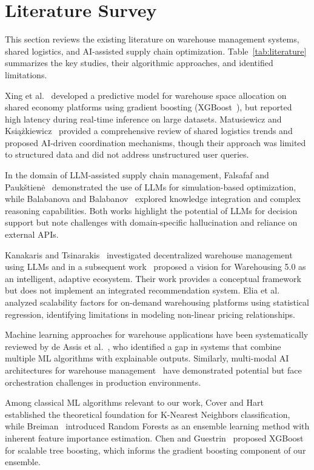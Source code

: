 \documentclass[pdflatex,sn-mathphys-num]{sn-jnl}
\theoremstyle{thmstyleone}
\theoremstyle{thmstyletwo}
\theoremstyle{thmstylethree}
\begin{document}
\section{Literature Survey}\label{sec2}

This section reviews the existing literature on warehouse management systems, shared logistics, and AI-assisted supply chain optimization. Table~\ref{tab:literature} summarizes the key studies, their algorithmic approaches, and identified limitations.

Xing et al.~\cite{b1} developed a predictive model for warehouse space allocation on shared economy platforms using gradient boosting (XGBoost~\cite{b12}), but reported high latency during real-time inference on large datasets. Matusiewicz and Ksi\k{a}\.zkiewicz~\cite{b2} provided a comprehensive review of shared logistics trends and proposed AI-driven coordination mechanisms, though their approach was limited to structured data and did not address unstructured user queries.

In the domain of LLM-assisted supply chain management, Falsafaf and Pauk\v{s}tien\.{e}~\cite{b3} demonstrated the use of LLMs for simulation-based optimization, while Balabanova and Balabanov~\cite{b7} explored knowledge integration and complex reasoning capabilities. Both works highlight the potential of LLMs for decision support but note challenges with domain-specific hallucination and reliance on external APIs.

Kanakaris and Tsinarakis~\cite{b4} investigated decentralized warehouse management using LLMs and in a subsequent work~\cite{b8} proposed a vision for Warehousing 5.0 as an intelligent, adaptive ecosystem. Their work provides a conceptual framework but does not implement an integrated recommendation system. Elia et al.~\cite{b5} analyzed scalability factors for on-demand warehousing platforms using statistical regression, identifying limitations in modeling non-linear pricing relationships.

Machine learning approaches for warehouse applications have been systematically reviewed by de Assis et al.~\cite{b10}, who identified a gap in systems that combine multiple ML algorithms with explainable outputs. Similarly, multi-modal AI architectures for warehouse management~\cite{b9} have demonstrated potential but face orchestration challenges in production environments.

Among classical ML algorithms relevant to our work, Cover and Hart~\cite{b11} established the theoretical foundation for K-Nearest Neighbors classification, while Breiman~\cite{b6} introduced Random Forests as an ensemble learning method with inherent feature importance estimation. Chen and Guestrin~\cite{b12} proposed XGBoost for scalable tree boosting, which informs the gradient boosting component of our ensemble.
\end{document}
